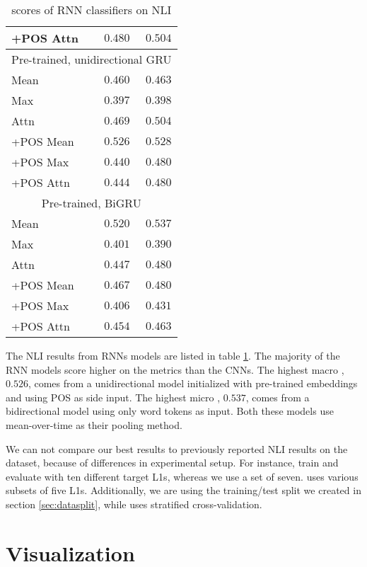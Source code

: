 \begin{table}
\begin{tabular}{lrr}
    +POS Attn & $0.480$ & $0.504$ \\
    \midrule \multicolumn{3}{c}{Pre-trained, unidirectional GRU} \\ \midrule
    Mean & $0.460$ & $0.463$ \\
    Max & $0.397$ & $0.398$ \\
    Attn & $0.469$ & $0.504$ \\
    +POS Mean & $\mathbf{0.526}$ & $0.528$ \\
    +POS Max & $0.440$ & $0.480$ \\
    +POS Attn & $0.444$ & $0.480$ \\
    \midrule \multicolumn{3}{c}{Pre-trained, BiGRU} \\ \midrule
    Mean & $0.520$ & $\mathbf{0.537}$ \\
    Max & $0.401$ & $0.390$ \\
    Attn & $0.447$ & $0.480$ \\
    +POS Mean & $0.467$ & $0.480$ \\
    +POS Max & $0.406$ & $0.431$ \\
    +POS Attn & $0.454$ & $0.463$ \\
    \bottomrule
  \end{tabular}
  \caption{\FI scores of RNN classifiers on NLI}
  \label{tab:rnn-nli-results}
\end{table}

The \ac{NLI} results from \acp{RNN} models are listed in table
\ref{tab:rnn-nli-results}. The majority of the RNN models score higher on the
\FI metrics than the \acp{CNN}. The highest macro \FI, $0.526$, comes from a
unidirectional model initialized with pre-trained embeddings and using POS as
side input. The highest micro \FI, $0.537$, comes from a bidirectional model
using only word tokens as input. Both these models use mean-over-time as
their pooling method.

We can not compare our best results to previously reported \ac{NLI} results
on the dataset, because of differences in experimental setup. For instance,
\textcite{malmasi2018native} train and evaluate with ten different target
\acp{L1}, whereas we use a set of seven. \textcite{pepper2012} uses various
subsets of five \acp{L1}. Additionally, we are using the training/test split
we created in section \ref{sec:datasplit}, while \textcite{malmasi2018native}
uses stratified cross-validation.


\section{Visualization}

